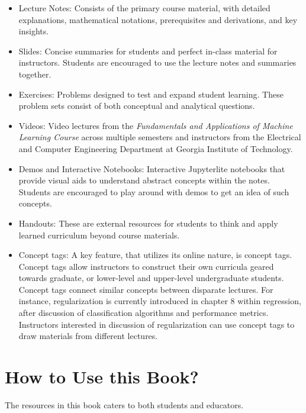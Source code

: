 \documentclass{article}
\begin{document}
\begin{itemize}
    \item Lecture Notes: Consists of the primary course material, with detailed explanations, mathematical notations, prerequisites and derivations, and key insights.
    \item Slides: Concise summaries for students and perfect in-class material for instructors. Students are encouraged to use the lecture notes and summaries together.
    \item Exercises: Problems designed to test and expand student learning. These problem sets consist of both conceptual and analytical questions. 
    \item Videos: Video lectures from the \emph{Fundamentals and Applications of Machine Learning Course} across multiple semesters and instructors from the Electrical and Computer Engineering Department at Georgia Institute of Technology.
    \item Demos and Interactive Notebooks: Interactive Jupyterlite notebooks that provide visual aids to understand abstract concepts within the notes. Students are encouraged to play around with demos to get an idea of such concepts. 
    \item Handouts: These are external resources for students to think and apply learned curriculum beyond course materials.
    \item Concept tags: A key feature, that utilizes its online nature, is concept tags. Concept tags allow instructors to construct their own curricula geared towards graduate, or lower-level and upper-level undergraduate students. Concept tags connect similar concepts between disparate lectures. For instance, regularization is currently introduced in chapter 8 within regression, after discussion of classification algorithms and performance metrics. Instructors interested in discussion of regularization can use concept tags to draw materials from different lectures.
\end{itemize}

\section{How to Use this Book?}

The resources in this book caters to both students and educators.
\end{document}
